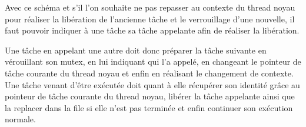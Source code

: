 Avec ce schéma et s'il l'on souhaite ne pas repasser au contexte du thread noyau pour réaliser la libération de l'ancienne tâche et le verrouillage d'une nouvelle, il faut pouvoir indiquer à une tâche sa tâche appelante afin de réaliser la libération.

Une tâche en appelant une autre doit donc préparer la tâche suivante en vérouillant son mutex, en lui indiquant qui l'a appelé, en changeant le pointeur de tâche courante du thread noyau et enfin en réalisant le changement de contexte. Une tâche venant d'être exécutée doit quant à elle récupérer son identité grâce au pointeur de tâche courante du thread noyau, libérer la tâche appelante ainsi que la replacer dans la file si elle n'est pas terminée et enfin continuer son exécution normale.
